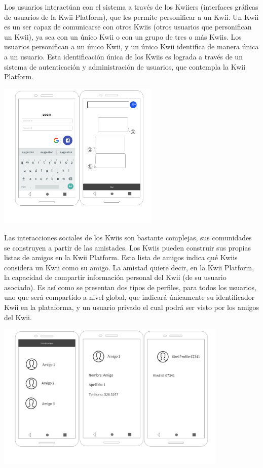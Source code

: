 Los usuarios interactúan con el sistema a través de los Kwiiers (interfaces gráficas de usuarios de la Kwii Platform), que les permite personificar a un Kwii. Un Kwii es un ser capaz de comunicarse con otros Kwiis (otros usuarios que personifican un Kwii), ya sea con un único Kwii o con un grupo de tres o más Kwiis. Los usuarios personifican a un único Kwii, y un único Kwii identifica de manera única a un usuario. Esta identificación única de los Kwiis es lograda a través de un sistema de autenticación y administración de usuarios, que contempla la Kwii Platform.
\begin{center}
    \includegraphics[height=7cm]{Figures/P1/example.jpeg}    
\end{center}
Las interacciones sociales de los Kwiis son bastante complejas, sus comunidades se construyen a partir de las amistades. Los Kwiis pueden construir sus propias listas de amigos en la Kwii Platform. Esta lista de amigos indica qué Kwiis considera un Kwii como su amigo. La amistad quiere decir, en la Kwii Platform, la capacidad de compartir información personal del Kwii (de su usuario asociado). Es así como se presentan dos tipos de perfiles, para todos los usuarios, uno que será compartido a nivel global, que indicará únicamente su identificador Kwii en la plataforma, y un usuario privado el cual podrá ser visto por los amigos del Kwii.
\begin{center}
    \includegraphics[height=7cm]{Figures/P1/example_2.jpeg}    
\end{center}
